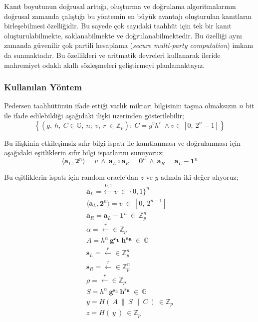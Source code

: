 \documentclass[a4paper,11pt]{article}
\begin{document}
Kanıt boyutunun doğrusal arttığı, oluşturma ve doğrulama algoritmalarının doğrusal zamanda çalıştığı bu yöntemin en büyük avantajı oluşturulan kanıtların birleşebilmesi özelliğidir. Bu sayede çok sayıdaki taahhüt için tek bir kanıt oluşturulabilmekte, saklanabilmekte ve doğrulanabilmektedir. Bu özelliği aynı zamanda güvenilir çok partili hesaplama (\emph{secure multi-party computation}) imkanı da sunmaktadır. Bu özellikleri ve aritmatik devreleri kullanarak ileride mahremiyet odaklı akıllı sözleşmeleri geliştirmeyi planlamaktayız.


\subsubsection{Kullanılan Yöntem}

Pedersen taahhütünün ifade ettiği varlık miktarı bilgisinin taşma olmaksızın $n$ bit ile ifade edilebildiği aşağıdaki ilişki üzerinden gösterilebilir;
$$\left\{( g,\ h,\ C\in \mathbb{G} ,\ n;\ v,\ r\ \in \mathbb{Z}_{p}) :\ C=g^{v} h^{r} \ \land v\in \left[ 0,\ 2^{n} -1\right]\right\}$$

Bu ilişkinin etkileşimsiz sıfır bilgi ispatı ile kanıtlanması ve doğrulanması için aşağıdaki eşitliklerin sıfır bilgi ispatlarını sunuyoruz;
$$\langle \mathbf{a}_{L} ,\mathbf{2}^{n} \rangle =v\ \land \ \mathbf{a}_{L} \circ \mathbf{a}_{R} =\mathbf{0}^{n} \ \land \ \mathbf{a}_{R} =\mathbf{a}_{L} -\mathbf{1}^{n}$$

Bu eşitliklerin ispatı için random oracle'dan $z$ ve $y$ adında iki değer alıyoruz;
$$
\begin{array}{l}
\mathbf{a}_{L} =\xleftarrow{0,1} v\ \in \ \{0,1\}^{n}\\
\langle \mathbf{a}_{L} ,\mathbf{2}^{n} \rangle =v\ \in \ \left[ 0,\ 2^{n-1}\right]\\
\mathbf{a}_{R} =\mathbf{a}_{L} -\mathbf{1}^{n} \ \in \ \mathbb{Z}^{n}_{p}\\
\alpha =\xleftarrow{r} \in \mathbb{Z}_{p}\\
A=h^{\alpha } \ \mathbf{g^{a_{L}}} \ \mathbf{h^{a_{R}}} \ \in \ \mathbb{G}\\
\mathbf{s}_{L} =\xleftarrow{r} \in \mathbb{Z}^{n}_{p}\\
\mathbf{s}_{R} =\xleftarrow{r} \in \mathbb{Z}^{n}_{p}\\
\rho =\xleftarrow{r} \in \mathbb{Z}_{p}\\
S=h^{\alpha } \ \mathbf{g^{\mathbf{s}_{L}}} \ \mathbf{h^{\mathbf{s}_{R}}} \ \in \ \mathbb{G}\\
y=H(\ A\ \| \ S\ \| \ C\ )\ \in \mathbb{Z}_{p}\\
z=H(\ y\ )\ \in \mathbb{Z}_{p}
\end{array}
$$
\end{document}
